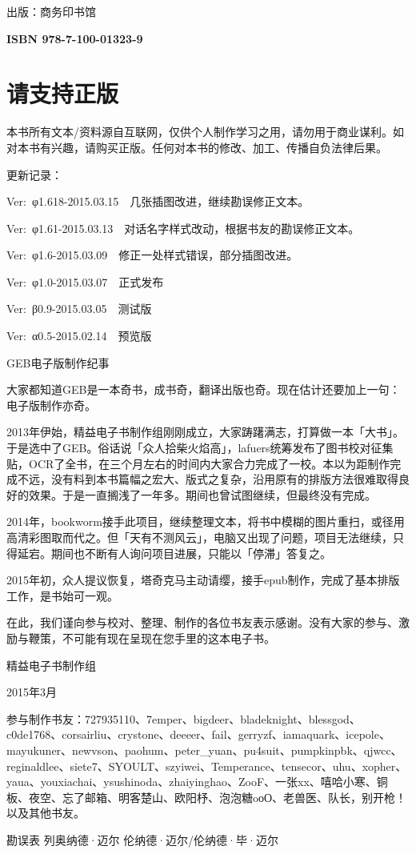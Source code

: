 \documentclass[
  12pt,
  twoside,
  openright,
  oldfontcommands,
]{memoir}
\newcommand{\westerntext}[1]{{\rmfamily #1}}
\begin{document}
出版：商务印书馆

\textbf{ISBN 978-7-100-01323-9}

\section{请支持正版}

本书所有文本/资料源自互联网，仅供个人制作学习之用，请勿用于商业谋利。如对本书有兴趣，请购买正版。任何对本书的修改、加工、传播自负法律后果。

更新记录：

Ver:~\westerntext{φ}1.618-2015.03.15　几张插图改进，继续勘误修正文本。

Ver:~\westerntext{φ}1.61-2015.03.13　对话名字样式改动，根据书友的勘误修正文本。

Ver:~\westerntext{φ}1.6-2015.03.09　修正一处样式错误，部分插图改进。

Ver:~\westerntext{φ}1.0-2015.03.07　正式发布

Ver:~\westerntext{β}0.9-2015.03.05　测试版

Ver:~\westerntext{α}0.5-2015.02.14　预览版

\label{Info_split_001.xhtml}{}

\label{Info_split_001.xhtml_calibre_pb_0}
GEB电子版制作纪事

大家都知道GEB是一本奇书，成书奇，翻译出版也奇。现在估计还要加上一句：电子版制作亦奇。

2013年伊始，精益电子书制作组刚刚成立，大家踌躇满志，打算做一本「大书」。于是选中了GEB。俗话说「众人拾柴火焰高」，lafuers统筹发布了图书校对征集贴，OCR了全书，在三个月左右的时间内大家合力完成了一校。本以为距制作完成不远，没有料到本书篇幅之宏大、版式之复杂，沿用原有的排版方法很难取得良好的效果。于是一直搁浅了一年多。期间也曾试图继续，但最终没有完成。

2014年，bookworm接手此项目，继续整理文本，将书中模糊的图片重扫，或径用高清彩图取而代之。但「天有不测风云」，电脑又出现了问题，项目无法继续，只得延宕。期间也不断有人询问项目进展，只能以「停滞」答复之。

2015年初，众人提议恢复，塔奇克马主动请缨，接手epub制作，完成了基本排版工作，是书始可一观。

在此，我们谨向参与校对、整理、制作的各位书友表示感谢。没有大家的参与、激励与鞭策，不可能有现在呈现在您手里的这本电子书。

精益电子书制作组

2015年3月

参与制作书友：727935110、7emper、bigdeer、bladeknight、blessgod、c0de1768、corsairliu、crystone、deeeer、fail、gerryzf、iamaquark、icepole、mayukuner、newvson、paohum、peter\_yuan、pu4suit、pumpkinpbk、qjwcc、reginaldlee、siete7、SYOULT、szyiwei、Temperance、tensecor、uhu、xopher、yaua、youxiachai、ysushinoda、zhaiyinghao、ZooF、一张xx、嘻哈小寒、铜板、夜空、忘了邮箱、明客楚山、欧阳杼、泡泡糖oоО、老兽医、队长，别开枪！以及其他书友。

勘误表 列奥纳德·迈尔 伦纳德·迈尔/伦纳德·毕·迈尔
\end{document}
